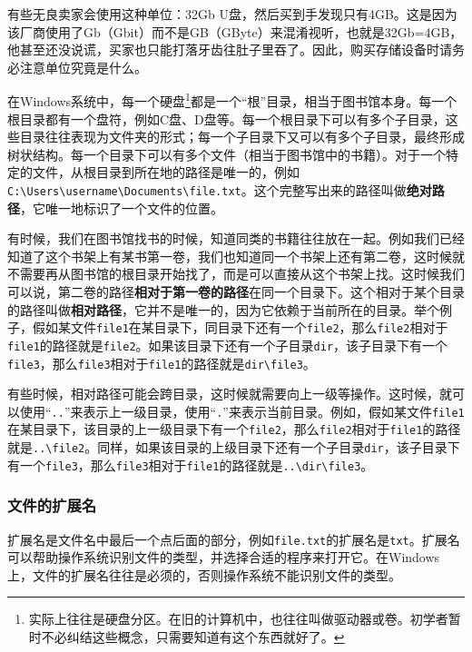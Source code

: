 \begin{caution}
  有些无良卖家会使用这种单位：32Gb U盘，然后买到手发现只有4GB。这是因为该厂商使用了Gb（Gbit）而不是GB（GByte）来混淆视听，也就是32Gb=4GB，他甚至还没说谎，买家也只能打落牙齿往肚子里吞了。因此，购买存储设备时请务必注意单位究竟是什么。
\end{caution}

在Windows系统中，每一个硬盘\footnote{实际上往往是硬盘分区。在旧的计算机中，也往往叫做驱动器或卷。初学者暂时不必纠结这些概念，只需要知道有这个东西就好了。}都是一个“根”目录，相当于图书馆本身。每一个根目录都有一个盘符，例如C盘、D盘等。每一个根目录下可以有多个子目录，这些目录往往表现为文件夹的形式；每一个子目录下又可以有多个子目录，最终形成树状结构。每一个目录下可以有多个文件（相当于图书馆中的书籍）。对于一个特定的文件，从根目录到所在地的路径是唯一的，例如\texttt{C:\textbackslash Users\textbackslash username\textbackslash Documents\textbackslash file.txt}。这个完整写出来的路径叫做\textbf{绝对路径}，它唯一地标识了一个文件的位置。

有时候，我们在图书馆找书的时候，知道同类的书籍往往放在一起。例如我们已经知道了这个书架上有某书第一卷，我们也知道同一个书架上还有第二卷，这时候就不需要再从图书馆的根目录开始找了，而是可以直接从这个书架上找。这时候我们可以说，第二卷的路径\textbf{相对于第一卷的路径}在同一个目录下。这个相对于某个目录的路径叫做\textbf{相对路径}，它并不是唯一的，因为它依赖于当前所在的目录。举个例子，假如某文件\texttt{file1}在某目录下，同目录下还有一个\texttt{file2}，那么\texttt{file2}相对于\texttt{file1}的路径就是\texttt{file2}。如果该目录下还有一个子目录\texttt{dir}，该子目录下有一个\texttt{file3}，那么\texttt{file3}相对于\texttt{file1}的路径就是\texttt{dir\textbackslash file3}。

有些时候，相对路径可能会跨目录，这时候就需要向上一级等操作。这时候，就可以使用“\texttt{..}”来表示上一级目录，使用“\texttt{.}”来表示当前目录。例如，假如某文件\texttt{file1}在某目录下，该目录的上一级目录下有一个\texttt{file2}，那么\texttt{file2}相对于\texttt{file1}的路径就是\texttt{..\textbackslash file2}。同样，如果该目录的上级目录下还有一个子目录\texttt{dir}，该子目录下有一个\texttt{file3}，那么\texttt{file3}相对于\texttt{file1}的路径就是\texttt{..\textbackslash dir\textbackslash file3}。

\subsubsection{文件的扩展名}

扩展名是文件名中最后一个点后面的部分，例如\texttt{file.txt}的扩展名是\texttt{txt}。扩展名可以帮助操作系统识别文件的类型，并选择合适的程序来打开它。在Windows上，文件的扩展名往往是必须的，否则操作系统不能识别文件的类型。

